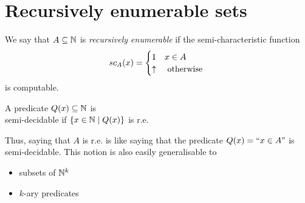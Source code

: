 \chapter{Recursively enumerable sets}

\begin{definition}
  We say that $ A \subseteq \mathbb{N} $ is \emph{recursively enumerable} if
  the semi-characteristic function 
  \begin{equation*}
    sc_A(x) = \begin{cases} 1 & x \in A \\ \uparrow & $
      otherwise $
    \end{cases}
  \end{equation*}
  is computable.
\end{definition}

\begin{definition}
  A predicate $ Q(x) \subseteq \mathbb{N} $ is\\
   semi-decidable if 
  \( \{ x \in \mathbb{N} \mid Q(x) \} \)
  is r.e.
\end{definition}

Thus, saying that $A$ is r.e. is like saying that the predicate $ Q(x)=``x \in A"
$ is semi-decidable. This notion is also easily generalisable to
\begin{itemize}
\item subsets of $\mathbb{N}^k$
\item $k$-ary predicates
\end{itemize}

